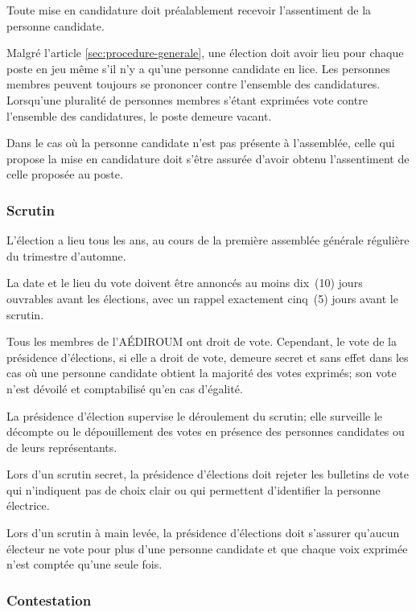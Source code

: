 \documentclass{aediroum}
\newcommand{\article}[1]{article \ref{#1}}
\begin{document}
Toute mise en candidature doit préalablement recevoir l'assentiment de la personne candidate.

Malgré l'\article{sec:procedure-generale}, une élection doit avoir lieu pour chaque poste en jeu même s'il n'y a qu'une personne candidate en lice. Les personnes membres peuvent toujours se prononcer contre l'ensemble des candidatures. Lorsqu'une pluralité de personnes membres s'étant exprimées vote contre l'ensemble des candidatures, le poste demeure vacant.

Dans le cas où la personne candidate n'est pas présente à l'assemblée, celle qui propose la mise en candidature doit s'être assurée d'avoir obtenu l'assentiment de celle proposée au poste.

\subsubsection{Scrutin}\label{sec:scrutin-elections}

L'élection a lieu tous les ans, au cours de la première assemblée générale régulière du trimestre d'automne.

La date et le lieu du vote doivent être annoncés au moins dix~(10) jours ouvrables avant les élections, avec un rappel exactement cinq~(5) jours avant le scrutin.

Tous les membres de l'AÉDIROUM ont droit de vote. Cependant, le vote de la présidence d'élections, si elle a droit de vote, demeure secret et sans effet dans les cas où une personne candidate obtient la majorité des votes exprimés; son vote n'est dévoilé et comptabilisé qu'en cas d'égalité.

La présidence d'élection supervise le déroulement du scrutin; elle surveille le décompte ou le dépouillement des votes en présence des personnes candidates ou de leurs représentants.

Lors d'un scrutin secret, la présidence d'élections doit rejeter les bulletins de vote qui n'indiquent pas de choix clair ou qui permettent d'identifier la personne électrice.

Lors d'un scrutin à main levée, la présidence d'élections doit s'assurer qu'aucun électeur ne vote pour plus d'une personne candidate et que chaque voix exprimée n'est comptée qu'une seule fois.

\subsubsection{Contestation}\label{sec:contestation}
\end{document}
